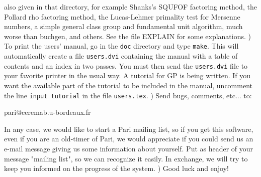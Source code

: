    also given in that directory, for example Shanks's SQUFOF factoring method,
   the Pollard rho factoring method, the Lucas-Lehmer primality test for
   Mersenne numbers, a simple general class group and fundamental unit
   algorithm, much worse than buchgen, and others. See the 
   file EXPLAIN for some explanations.
) To print the users' manual, go in the {\tt doc} directory and type 
   {\tt make}. This will automatically create a file {\tt users.dvi} 
   containing the manual with a table of contents and an index in two passes. 
   You must then send the {\tt users.dvi} file to your favorite printer in 
   the usual way. A tutorial for GP is being written. If you want the 
   available part of the tutorial to be included in the manual, uncomment the
   line {\tt \bs input tutorial} in the file {\tt users.tex}.
) Send bugs, comments, etc... to:

\centerline{pari@ceremab.u-bordeaux.fr}

   In any case, we would like to start a Pari mailing list, so if you get
   this software, even if you are an old-timer of Pari, we would appreciate
   if you could send us an e-mail message giving us some information about
   yourself. Put as header of your message "mailing list", so we can recognize
   it easily. In exchange, we will try to keep you informed on the progress of
   the system.
) Good luck and enjoy!


\vfill\eject
